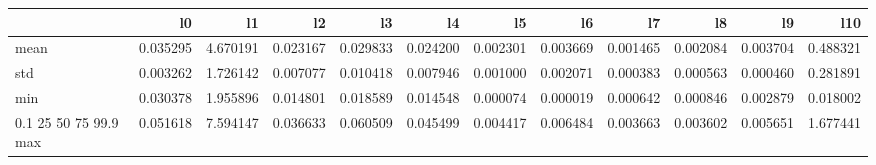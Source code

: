 \begin{tabular}{lrrrrrrrrrrr}
\toprule
 & l0 & l1 & l2 & l3 & l4 & l5 & l6 & l7 & l8 & l9 & l10 \\
\midrule
mean & 0.035295 & 4.670191 & 0.023167 & 0.029833 & 0.024200 & 0.002301 & 0.003669 & 0.001465 & 0.002084 & 0.003704 & 0.488321 \\
std & 0.003262 & 1.726142 & 0.007077 & 0.010418 & 0.007946 & 0.001000 & 0.002071 & 0.000383 & 0.000563 & 0.000460 & 0.281891 \\
min & 0.030378 & 1.955896 & 0.014801 & 0.018589 & 0.014548 & 0.000074 & 0.000019 & 0.000642 & 0.000846 & 0.002879 & 0.018002 \\
0.1%
25%
50%
75%
99.9%
max & 0.051618 & 7.594147 & 0.036633 & 0.060509 & 0.045499 & 0.004417 & 0.006484 & 0.003663 & 0.003602 & 0.005651 & 1.677441 \\
\bottomrule
\end{tabular}
